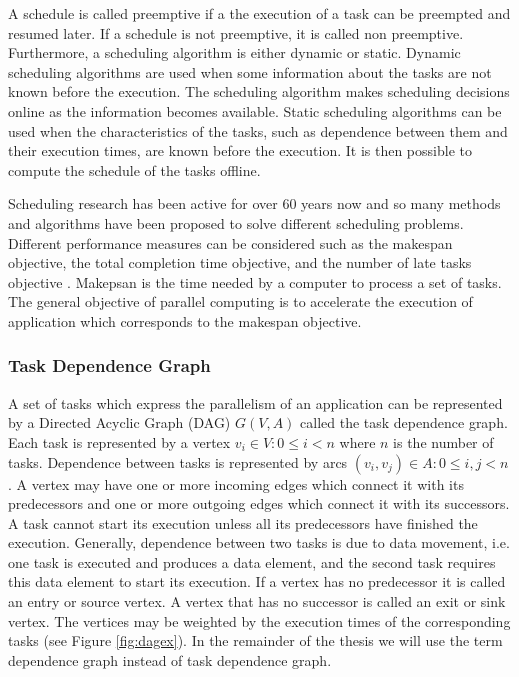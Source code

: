A schedule is called preemptive if a the execution of a task can be preempted and resumed later. If a schedule is not preemptive, it is called non preemptive. Furthermore, a scheduling algorithm is either dynamic or static. Dynamic scheduling algorithms are used when some information about the tasks are not known before the execution. The scheduling algorithm makes scheduling decisions online as the information becomes available. Static scheduling algorithms can be used when the characteristics of the tasks, such as dependence between them and their execution times, are known before the execution. It is then possible to compute the schedule of the tasks offline.

Scheduling research has been active for over 60 years now and so many methods and algorithms have been proposed to solve different scheduling problems. Different performance measures can be considered such as the makespan objective, the total completion time objective, and the number of late tasks objective \cite{leung:2004}. Makepsan is the time needed by a computer to process a set of tasks. The general objective of parallel computing is to accelerate the execution of application which corresponds to the makespan objective.

\subsubsection{Task Dependence Graph}

A set of tasks which express the parallelism of an application can be represented by a Directed Acyclic Graph (DAG) $G(V,A)$ called the task dependence graph. Each task is represented by a vertex $v_i \in V: 0 \leq i < n$ where $n$ is the number of tasks. Dependence between tasks is represented by arcs $(v_i, v_j) \in A: 0 \leq i,j < n$. A vertex may have one or more incoming edges which connect it with its predecessors and one or more outgoing edges which connect it with its successors. A task cannot start its execution unless all its predecessors have finished the execution. Generally, dependence between two tasks is due to data movement, i.e. one task is executed and produces a data element, and the second task requires this data element to start its execution. If a vertex has no predecessor it is called an entry or source vertex. A vertex that has no successor is called an exit or sink vertex. The vertices may be weighted by the execution times of the corresponding tasks (see Figure \ref{fig:dagex}). In the remainder of the thesis we will use the term dependence graph instead of task dependence graph.

